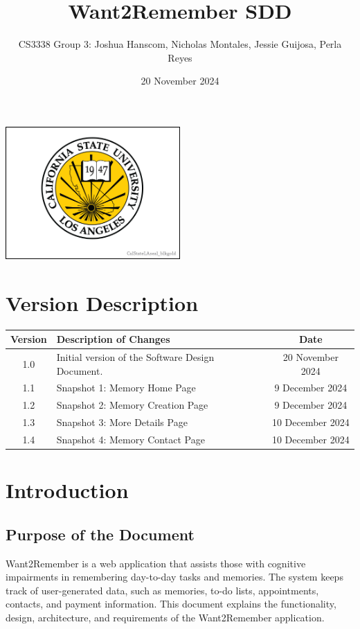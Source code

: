 \documentclass{article}
\title{Want2Remember SDD}
\author{CS3338 Group 3: Joshua Hanscom, Nicholas Montales, Jessie Guijosa, Perla Reyes}
\date{20 November 2024}
\begin{document}
\maketitle
\begin{center}
	\includegraphics[width=0.5\textwidth]{brand.png}
\end{center}
\newpage
\tableofcontents
\newpage

\section*{Version Description}
\begin{tabular}{|c|p{10cm}|c|}
\hline
\textbf{Version} & \textbf{Description of Changes} & \textbf{Date} \\ \hline
1.0 & Initial version of the Software Design Document. & 20 November 2024 \\ \hline
1.1 & Snapshot 1: Memory Home Page & 9 December 2024 \\ \hline
1.2 & Snapshot 2: Memory Creation Page & 9 December 2024 \\ \hline
1.3 & Snapshot 3: More Details Page & 10 December 2024 \\ \hline
1.4 & Snapshot 4: Memory Contact Page & 10 December 2024 \\ \hline
\end{tabular}
\newpage

\section{Introduction}
\subsection{Purpose of the Document}
Want2Remember is a web application that assists those with cognitive impairments in remembering day-to-day tasks and memories. The system keeps track of user-generated data, such as memories, to-do lists, appointments, contacts, and payment information. This document explains the functionality, design, architecture, and requirements of the Want2Remember application.
\end{document}
